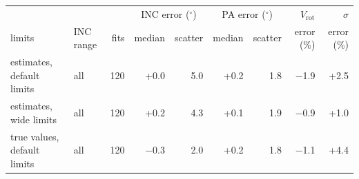 \begin{tabular}{l l r rr rr rr}
\toprule
 & & & \multicolumn{2}{c}{INC error ($^\circ$)} & \multicolumn{2}{c}{PA error ($^\circ$)} & $V_\mathrm{rot}$ & $\sigma$ \\
limits & INC range & fits & median & scatter & median & scatter & error (\%) & error (\%) \\
\midrule
estimates, default limits & all & 120 & +0.0 & 5.0 & +0.2 & 1.8 & $-$1.9 & +2.5 \\
\addlinespace
estimates, wide limits & all & 120 & +0.2 & 4.3 & +0.1 & 1.9 & $-$0.9 & +1.0 \\
\addlinespace
true values, default limits & all & 120 & $-$0.3 & 2.0 & +0.2 & 1.8 & $-$1.1 & +4.4 \\
\bottomrule
\end{tabular}
